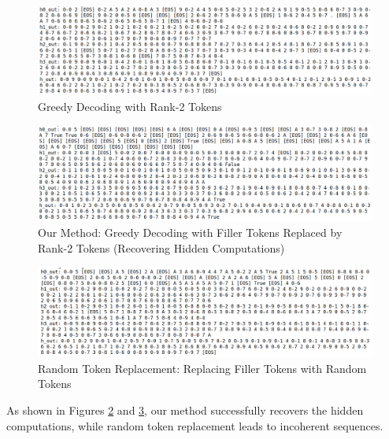 \documentclass{article}
\begin{document}
\begin{figure}[H]
    \centering
    \includegraphics[width=\textwidth]{rank2_decoding.png}
    \caption{Greedy Decoding with Rank-2 Tokens}
    \label{fig:rank2}
\end{figure}

\begin{figure}[H]
    \centering
    \includegraphics[width=\textwidth]{our_method_decoding.png}
    \caption{Our Method: Greedy Decoding with Filler Tokens Replaced by Rank-2 Tokens (Recovering Hidden Computations)}
    \label{fig:our-method}
\end{figure}

\begin{figure}[H]
    \centering
    \includegraphics[width=\textwidth]{random_tokens_decoding.png}
    \caption{Random Token Replacement: Replacing Filler Tokens with Random Tokens}
    \label{fig:random}
\end{figure}

As shown in Figures \ref{fig:our-method} and \ref{fig:random}, our method successfully recovers the hidden computations, while random token replacement leads to incoherent sequences.
\end{document}
